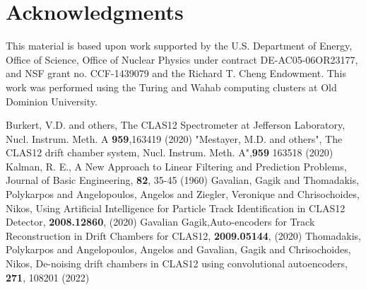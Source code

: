 \documentclass{webofc}
\begin{document}
\section{Acknowledgments}
\label{Acknowledgments}

This material is based upon work supported by the U.S. Department of Energy, Office of Science, Office of Nuclear Physics under contract DE-AC05-06OR23177, and
 NSF grant no. CCF-1439079 and the Richard T. Cheng Endowment. This work was performed using the Turing and Wahab computing clusters at Old Dominion University.
 
\begin{thebibliography}{}
%
%
Burkert, V.D. and others, The CLAS12 Spectrometer at Jefferson Laboratory, Nucl. Instrum. Meth. A \textbf{959},163419 (2020)
 "Mestayer, M.D. and others", The CLAS12 drift chamber system, Nucl. Instrum. Meth. A",\textbf{959} 163518 (2020)
  Kalman, R. E., A New Approach to Linear Filtering and Prediction Problems, Journal of Basic Engineering, \textbf{82}, 35-45 (1960)
Gavalian, Gagik and Thomadakis, Polykarpos and Angelopoulos, Angelos and Ziegler, Veronique and Chrisochoides, Nikos, Using Artificial Intelligence for Particle Track Identification in CLAS12 Detector, \textbf{2008.12860}, (2020)
 Gavalian Gagik,Auto-encoders for Track Reconstruction in Drift Chambers for CLAS12, \textbf{2009.05144}, (2020)
   Thomadakis, Polykarpos and Angelopoulos, Angelos and Gavalian, Gagik and Chrisochoides, Nikos, De-noising drift chambers in CLAS12 using convolutional autoencoders, \textbf{271}, 108201 (2022)
\end{thebibliography}
\end{document}
